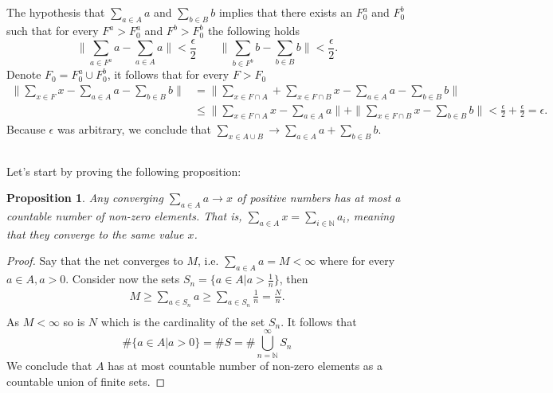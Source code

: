\documentclass[a4paper,12pt]{article} %
\newtheorem{proposition}{Proposition}
\begin{document}
\subsection{}
The hypothesis that \(\sum_{a \in  A}a  \) and \(\sum_{b \in  B}b  \) implies that there exists an \(F_0^a\) and \(F_0^b\) such that for every \(F^a>F_0^a\) and \(F^b>F_0^b\) the following holds
\begin{equation}
    \| \sum_{a \in  F^a}a - \sum_{a \in  A}a   \| < \frac{\epsilon}{2} \quad \quad \| \sum_{b \in  F^b}b - \sum_{b \in  B}b   \|< \frac{\epsilon}{2}.
\end{equation}
Denote \(F_0 = F_0^a \cup F_0^b\), it follows that for every \(F > F_0\)
\begin{align*}
    \| \sum_{x \in  F}x - \sum_{a\in A}a - \sum_{b \in  B }b    \| & = \| \sum_{x \in  F \cap A} + \sum_{x \in F \cap B}x - \sum_{a \in  A}a - \sum_{b \in  B}b     \|                                                             \\
                                                                   & \leq \| \sum_{x \in  F \cap A}x - \sum_{a \in  A}a   \|+\| \sum_{x \in F \cap B}x - \sum_{b \in  B }b \|< \frac{\epsilon}{2} + \frac{\epsilon}{2} = \epsilon.
\end{align*}
Because \(\epsilon\) was arbitrary, we conclude that \(\sum_{x \in A \cup B}\to \sum_{a \in  A} a + \sum_{b \in  B}b   \).

\subsection{}
Let's start by proving the following proposition:

\begin{proposition}
    Any converging \(\sum_{a \in  A}a \to x\)  of positive numbers has at most a countable number of non-zero elements. That is, \(\sum_{a \in A}x = \sum_{i \in  \mathbb{N}}a_i \), meaning that they converge to the same value \(x\).
\end{proposition}
\begin{proof}
    Say that the net converges to \(M\), i.e. \(\sum_{a \in  A} a = M <\infty  \) where for every \(a \in A, a>0\). Consider now the sets \(S_n = \{ a \in  A | a> \frac{1}{n} \} \), then
    \begin{align*}
        M \geq \sum_{a \in  S_n}a \geq  \sum_{a \in  S_n}\frac{1}{n}= \frac{N}{n}. \\
    \end{align*}
    As \(M < \infty \)  so is \(N\) which is the cardinality of the set \(S_n\).
    It follows that
    \begin{equation}
        \# \{ a \in  A | a>0 \}= \# S = \# \bigcup_{n=\mathbb{N}}^{\infty} S_n
    \end{equation}
    We conclude that \(A\) has at most countable number of non-zero elements as a countable union of finite sets.
\end{proof}
\end{document}

